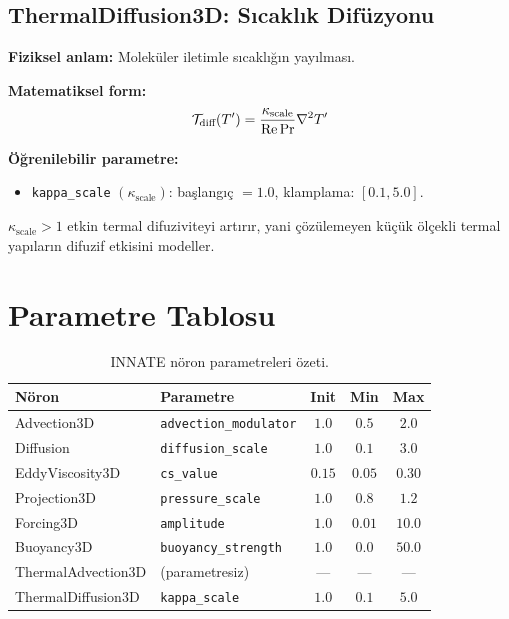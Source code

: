 \subsection{ThermalDiffusion3D: Sıcaklık Difüzyonu}
\label{sec:thermal_diff_noron}

\textbf{Fiziksel anlam:} Moleküler iletimle sıcaklığın yayılması.

\textbf{Matematiksel form:}
\begin{equation}
    \mathcal{T}_{\text{diff}}(T') = \frac{\kappa_{\text{scale}}}{\mathrm{Re} \, \mathrm{Pr}} \nabla^2 T'
    \label{eq:thermal_diff_neuron}
\end{equation}

\textbf{Öğrenilebilir parametre:}
\begin{itemize}
    \item \texttt{kappa\_scale} $(\kappa_{\text{scale}})$: başlangıç $= 1.0$, klamplama: $[0.1, 5.0]$.
\end{itemize}
$\kappa_{\text{scale}} > 1$ etkin termal difuziviteyi artırır, yani çözülemeyen küçük ölçekli termal yapıların difuzif etkisini modeller.


\section{Parametre Tablosu}
\label{sec:parametre_tablosu}

\begin{table}[H]
\centering
\caption{INNATE nöron parametreleri özeti.}
\label{tab:neuron_params}
\begin{tabular}{@{}llccc@{}}
\toprule
\textbf{Nöron} & \textbf{Parametre} & \textbf{Init} & \textbf{Min} & \textbf{Max} \\
\midrule
Advection3D        & \texttt{advection\_modulator}  & $1.0$  & $0.5$  & $2.0$ \\
Diffusion          & \texttt{diffusion\_scale}      & $1.0$  & $0.1$  & $3.0$ \\
EddyViscosity3D    & \texttt{cs\_value}             & $0.15$ & $0.05$ & $0.30$ \\
Projection3D       & \texttt{pressure\_scale}       & $1.0$  & $0.8$  & $1.2$ \\
Forcing3D          & \texttt{amplitude}             & $1.0$  & $0.01$ & $10.0$ \\
Buoyancy3D         & \texttt{buoyancy\_strength}    & $1.0$  & $0.0$  & $50.0$ \\
ThermalAdvection3D & (parametresiz)                 & ---    & ---    & --- \\
ThermalDiffusion3D & \texttt{kappa\_scale}          & $1.0$  & $0.1$  & $5.0$ \\
\bottomrule
\end{tabular}
\end{table}

